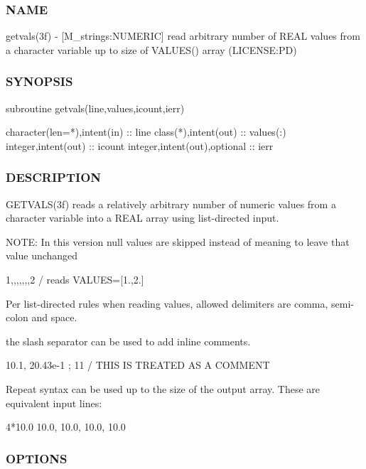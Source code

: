 \subsubsection*{N\+A\+ME}

getvals(3f) -\/ \mbox{[}M\+\_\+strings\+:N\+U\+M\+E\+R\+IC\mbox{]} read arbitrary number of R\+E\+AL values from a character variable up to size of V\+A\+L\+U\+E\+S() array (L\+I\+C\+E\+N\+SE\+:PD) 

\subsubsection*{S\+Y\+N\+O\+P\+S\+IS}

\begin{DoxyVerb}subroutine getvals(line,values,icount,ierr)

 character(len=*),intent(in)  :: line
 class(*),intent(out)         :: values(:)
 integer,intent(out)          :: icount
 integer,intent(out),optional :: ierr
\end{DoxyVerb}
 \subsubsection*{D\+E\+S\+C\+R\+I\+P\+T\+I\+ON}

G\+E\+T\+V\+A\+L\+S(3f) reads a relatively arbitrary number of numeric values from a character variable into a R\+E\+AL array using list-\/directed input.

N\+O\+TE\+: In this version null values are skipped instead of meaning to leave that value unchanged

1,,,,,,,2 / reads V\+A\+L\+U\+ES=\mbox{[}1.,2.\mbox{]}

Per list-\/directed rules when reading values, allowed delimiters are comma, semi-\/colon and space.

the slash separator can be used to add inline comments. \begin{DoxyVerb} 10.1, 20.43e-1 ; 11 / THIS IS TREATED AS A COMMENT
\end{DoxyVerb}


Repeat syntax can be used up to the size of the output array. These are equivalent input lines\+: \begin{DoxyVerb} 4*10.0
 10.0, 10.0, 10.0, 10.0
\end{DoxyVerb}


\subsubsection*{O\+P\+T\+I\+O\+NS}

